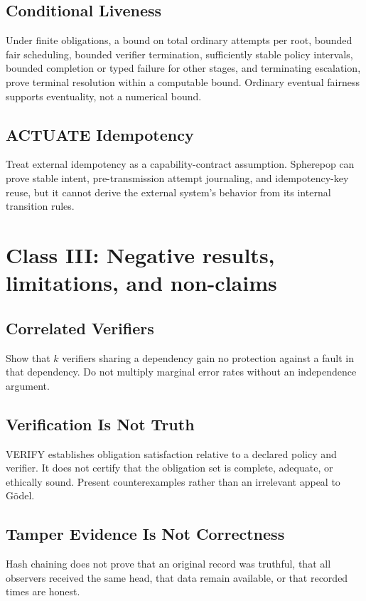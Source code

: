 \documentclass[11pt,openany]{book}
\begin{document}
\subsection{Conditional Liveness}
Under finite obligations, a bound on total ordinary attempts per root, bounded
fair scheduling, bounded verifier termination, sufficiently stable policy
intervals, bounded completion or typed failure for other stages, and
terminating escalation, prove terminal resolution within a computable bound.
Ordinary eventual fairness supports eventuality, not a numerical bound.

\subsection{ACTUATE Idempotency}
Treat external idempotency as a capability-contract assumption. Spherepop can
prove stable intent, pre-transmission attempt journaling, and idempotency-key
reuse, but it cannot derive the
external system's behavior from its internal transition rules.

\section{Class III: Negative results, limitations, and non-claims}

\subsection{Correlated Verifiers}
Show that \(k\) verifiers sharing a dependency gain no protection against a
fault in that dependency. Do not multiply marginal error rates without an
independence argument.

\subsection{Verification Is Not Truth}
VERIFY establishes obligation satisfaction relative to a declared policy and
verifier. It does not certify that the obligation set is complete, adequate,
or ethically sound. Present counterexamples rather than an irrelevant appeal
to G\"odel.

\subsection{Tamper Evidence Is Not Correctness}
Hash chaining does not prove that an original record was truthful, that all
observers received the same head, that data remain available, or that recorded
times are honest.
\end{document}
